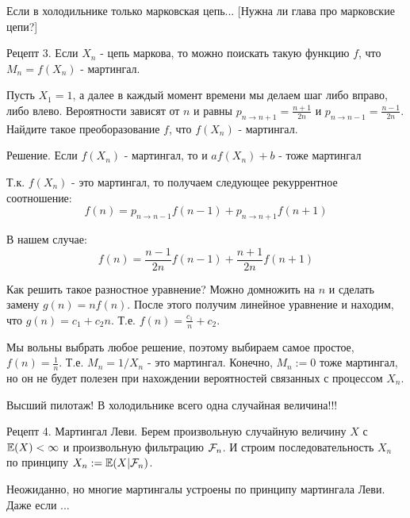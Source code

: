 {Если в холодильнике только марковская цепь... [Нужна ли глава про марковские цепи?]

Рецепт 3. Если $X_{n}$ - цепь маркова, то можно поискать такую функцию $f$, что $M_{n}=f(X_{n})$ - мартингал.

\begin{myex}
Пусть $X_{1}=1$, а далее в каждый момент времени мы делаем шаг либо вправо, либо влево. Вероятности зависят от $n$ и равны $p_{n\to n+1}=\frac{n+1}{2n}$ и $p_{n\to n-1}=\frac{n-1}{2n}$. Найдите такое преоборазование $f$, что $f(X_{n})$ - мартингал.

Решение. Если $f(X_{n})$ - мартингал, то и $af(X_{n})+b$ - тоже мартингал

Т.к. $f(X_{n})$ - это мартингал, то получаем следующее рекуррентное соотношение:
\begin{equation}
f(n)=p_{n\to n-1} f(n-1)+p_{n\to n+1} f(n+1)
\end{equation}

В нашем случае:
\begin{equation}
f(n)=\frac{n-1}{2n}f(n-1)+\frac{n+1}{2n} f(n+1)
\end{equation}

Как решить такое разностное уравнение? Можно домножить на $n$ и сделать замену $g(n)=nf(n)$. После этого получим линейное уравнение и находим, что $g(n)=c_{1}+c_{2}n$. Т.е. $f(n)=\frac{c_{1}}{n}+c_{2}$.

Мы вольны выбрать любое решение, поэтому выбираем самое простое, $f(n)=\frac{1}{n}$. Т.е. $M_{n}=1/X_{n}$ - это мартингал. Конечно, $M_{n}:=0$ тоже мартингал, но он не будет полезен при нахождении вероятностей связанных с процессом $X_{n}$.
\end{myex}







Высший пилотаж! В холодильнике всего одна случайная величина!!!

\begin{myex}
Рецепт 4. Мартингал Леви. Берем произвольную случайную величину $X$ с $\mathbb{E}(X)<\infty$ и произвольную фильтрацию $\mathcal{F}_{n}$. И строим последовательность $X_{n}$ по принципу $X_{n}:=\mathbb{E}(X|\mathcal{F}_{n})$.
\end{myex}

Неожиданно, но многие мартингалы устроены по принципу мартингала Леви. Даже если ...









}
